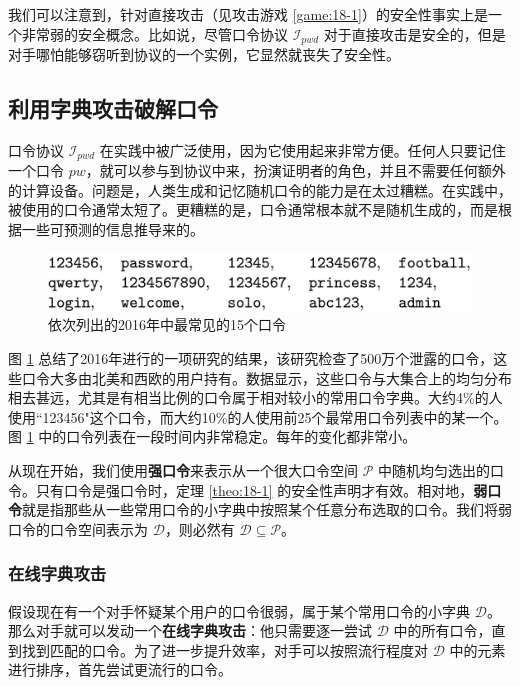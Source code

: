 我们可以注意到，针对直接攻击（见攻击游戏 \ref{game:18-1}）的安全性事实上是一个非常弱的安全概念。比如说，尽管口令协议 $\mathcal{I}_{pwd}$ 对于直接攻击是安全的，但是对手哪怕能够窃听到协议的一个实例，它显然就丧失了安全性。

\subsection{利用字典攻击破解口令}

口令协议 $\mathcal{I}_{pwd}$ 在实践中被广泛使用，因为它使用起来非常方便。任何人只要记住一个口令 $pw$，就可以参与到协议中来，扮演证明者的角色，并且不需要任何额外的计算设备。问题是，人类生成和记忆随机口令的能力是在太过糟糕。在实践中，被使用的口令通常太短了。更糟糕的是，口令通常根本就不是随机生成的，而是根据一些可预测的信息推导来的。

\begin{figure}
    \centering
    \includegraphics[width=0.6\linewidth]{figures/chapter18/fig3.png}
    \caption{依次列出的2016年中最常见的15个口令}
    \label{fig:18-3}
\end{figure}

图 \ref{fig:18-3} 总结了2016年进行的一项研究的结果，该研究检查了500万个泄露的口令，这些口令大多由北美和西欧的用户持有。数据显示，这些口令与大集合上的均匀分布相去甚远，尤其是有相当比例的口令属于相对较小的常用口令字典。大约4\%的人使用``123456"这个口令，而大约10\%的人使用前25个最常用口令列表中的某一个。图 \ref{fig:18-3} 中的口令列表在一段时间内非常稳定。每年的变化都非常小。

从现在开始，我们使用\textbf{强口令}来表示从一个很大口令空间 $\mathcal{P}$ 中随机均匀选出的口令。只有口令是强口令时，定理 \ref{theo:18-1} 的安全性声明才有效。相对地，\textbf{弱口令}就是指那些从一些常用口令的小字典中按照某个任意分布选取的口令。我们将弱口令的口令空间表示为 $\mathcal{D}$，则必然有 $\mathcal{D}\subseteq\mathcal{P}$。

\subsubsection{在线字典攻击}

假设现在有一个对手怀疑某个用户的口令很弱，属于某个常用口令的小字典 $\mathcal{D}$。那么对手就可以发动一个\textbf{在线字典攻击}：他只需要逐一尝试 $\mathcal{D}$ 中的所有口令，直到找到匹配的口令。为了进一步提升效率，对手可以按照流行程度对 $\mathcal{D}$ 中的元素进行排序，首先尝试更流行的口令。

